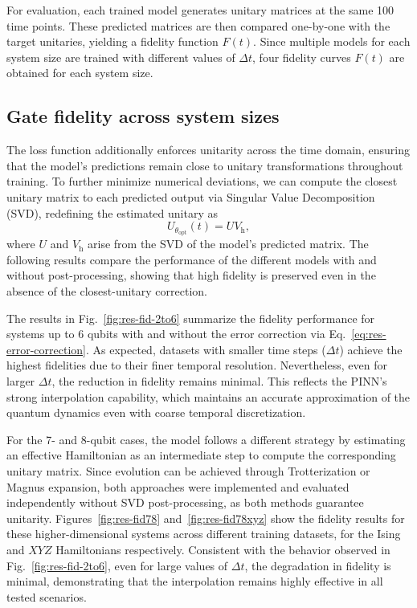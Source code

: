 For evaluation, each trained model generates unitary matrices at the same 100 time points. These predicted matrices are then compared one-by-one with the target unitaries, yielding a fidelity function $F(t)$. Since multiple models for each system size are trained with different values of $\Delta t$, four fidelity curves $F(t)$ are obtained for each system size.

\subsection{Gate fidelity across system sizes}
\label{sec:res-fidelity}

The loss function additionally enforces unitarity across the time domain, ensuring that the model's predictions remain close to unitary transformations throughout training. To further minimize numerical deviations, we can compute the closest unitary matrix to each predicted output via Singular Value Decomposition (SVD), redefining the estimated unitary as
\begin{equation}
  \label{eq:res-error-correction}
  U_{\theta_{\mathrm{opt}}}(t) = U V_{\mathrm{h}},
\end{equation}
where $U$ and $V_{\mathrm{h}}$ arise from the SVD of the model's predicted matrix. The following results compare the performance of the different models with and without post-processing, showing that high fidelity is preserved even in the absence of the closest-unitary correction.

The results in Fig.~\ref{fig:res-fid-2to6} summarize the fidelity performance for systems up to 6 qubits with and without the error correction via Eq.~\eqref{eq:res-error-correction}. As expected, datasets with smaller time steps ($\Delta t$) achieve the highest fidelities due to their finer temporal resolution. Nevertheless, even for larger $\Delta t$, the reduction in fidelity remains minimal. This reflects the PINN's strong interpolation capability, which maintains an accurate approximation of the quantum dynamics even with coarse temporal discretization.

For the 7- and 8-qubit cases, the model follows a different strategy by estimating an effective Hamiltonian as an intermediate step to compute the corresponding unitary matrix. Since evolution can be achieved through Trotterization or Magnus expansion, both approaches were implemented and evaluated independently without SVD post-processing, as both methods guarantee unitarity. Figures~\ref{fig:res-fid78} and~\ref{fig:res-fid78xyz} show the fidelity results for these higher-dimensional systems across different training datasets, for the Ising and $XYZ$ Hamiltonians respectively. Consistent with the behavior observed in Fig.~\ref{fig:res-fid-2to6}, even for large values of $\Delta t$, the degradation in fidelity is minimal, demonstrating that the interpolation remains highly effective in all tested scenarios.

